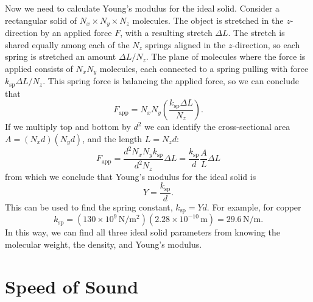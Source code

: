 Now we need to calculate Young's modulus for the ideal solid.
Consider a rectangular solid of $N_x \times N_y \times N_z$ molecules.
The object is stretched in the $z$-direction by an applied force $F$,
with a resulting stretch $\Delta L$.  The stretch is shared equally
among each of the $N_z$ springs aligned in the $z$-direction, so each
spring is stretched an amount $\Delta L/N_z$.  The plane of molecules
where the force is applied consists of $N_xN_y$ molecules, each
connected to a spring pulling with force $k_\text{sp}\Delta L/N_z$.  This
spring force is balancing the applied force, so we can conclude that
\begin{equation}
F_\text{app}= N_xN_y \left(\frac{k_\text{sp} \Delta L}{N_z}\right).
\end{equation}
If we multiply top and bottom by $d^2$ we can identify the
cross-sectional area $A=(N_x d)(N_y d)$, and the length $L=N_z d$:
\begin{equation}
F_\text{app}=\frac{d^2N_xN_y k_\text{sp}}{d^2 N_z} \Delta L 
                = \frac{k_\text{sp}}{d}
\frac{A}{L}\Delta L
\end{equation}
from which we conclude that Young's modulus for the ideal solid
is
\begin{equation}
Y=\frac{k_\text{sp}}{d}.
\end{equation}
This can be used to find the spring constant, $k_\text{sp} = Yd$.  For
example, for copper
\begin{equation}
k_\text{sp} = (130\times 10^9\,\text{N}/\text{m}^2)(2.28\times 10^{-10}\,\text{m})
 = 29.6\,\text{N/m}.
\end{equation}
In this way, we can find all three ideal solid parameters from
knowing the molecular weight, the density, and Young's modulus.


\section{Speed of Sound}
\label{sec:speedofsound}

